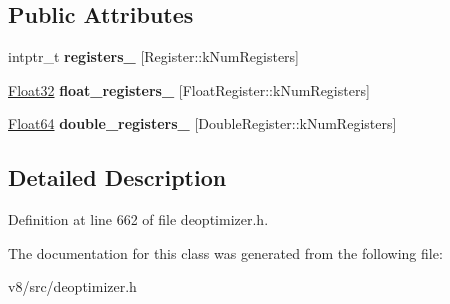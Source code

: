 \subsection*{Public Attributes}
\begin{DoxyCompactItemize}
\item 
\mbox{\label{classv8_1_1internal_1_1RegisterValues_abc424dd454f0303fdd1c4ada7474587b}} 
intptr\+\_\+t {\bfseries registers\+\_\+} \mbox{[}Register\+::k\+Num\+Registers\mbox{]}
\item 
\mbox{\label{classv8_1_1internal_1_1RegisterValues_ae86e5e2a54390639a462b183984938f7}} 
\mbox{\hyperlink{classv8_1_1internal_1_1Float32}{Float32}} {\bfseries float\+\_\+registers\+\_\+} \mbox{[}Float\+Register\+::k\+Num\+Registers\mbox{]}
\item 
\mbox{\label{classv8_1_1internal_1_1RegisterValues_a19e630b03f3b8f4c663d4f57328d5cfc}} 
\mbox{\hyperlink{classv8_1_1internal_1_1Float64}{Float64}} {\bfseries double\+\_\+registers\+\_\+} \mbox{[}Double\+Register\+::k\+Num\+Registers\mbox{]}
\end{DoxyCompactItemize}


\subsection{Detailed Description}


Definition at line 662 of file deoptimizer.\+h.



The documentation for this class was generated from the following file\+:\begin{DoxyCompactItemize}
\item 
v8/src/deoptimizer.\+h\end{DoxyCompactItemize}
